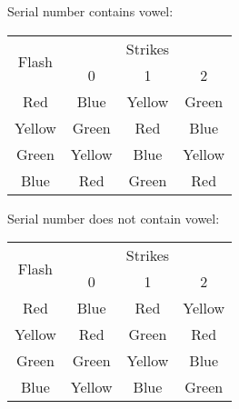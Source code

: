 \documentclass[11pt]{article}
\begin{document}
\begin{multicols}{2}

Serial number contains vowel:

\begin{tabular}{|c|c|c|c|}
\hline
\multirow{2}{*}{Flash} & \multicolumn{3}{|c|}{Strikes} \\
\cline{2-4}
 & 0 & 1 & 2 \\
\hline
Red & Blue & Yellow & Green \\
Yellow & Green & Red & Blue \\
Green & Yellow & Blue & Yellow \\
Blue & Red & Green & Red \\
\hline
\end{tabular}

Serial number does not contain vowel:

\begin{tabular}{|c|c|c|c|}
\hline
\multirow{2}{*}{Flash} & \multicolumn{3}{|c|}{Strikes} \\
\cline{2-4}
 & 0 & 1 & 2 \\
\hline
Red & Blue & Red & Yellow \\
Yellow & Red & Green & Red \\
Green & Green & Yellow & Blue \\
Blue & Yellow & Blue & Green \\
\hline
\end{tabular}

\end{multicols}
\end{document}
